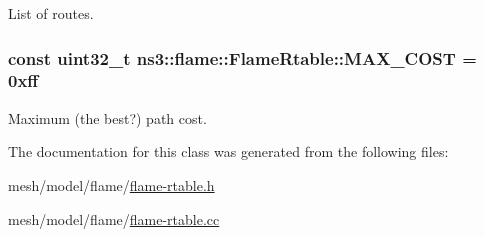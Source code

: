 List of routes. 

\subsubsection[{\texorpdfstring{M\+A\+X\+\_\+\+C\+O\+ST}{MAX_COST}}]{\setlength{\rightskip}{0pt plus 5cm}const uint32\+\_\+t ns3\+::flame\+::\+Flame\+Rtable\+::\+M\+A\+X\+\_\+\+C\+O\+ST = 0xff\hspace{0.3cm}{\ttfamily [static]}}\hypertarget{classns3_1_1flame_1_1FlameRtable_abc65618c03b34257555012ddab0bbf36}{}\label{classns3_1_1flame_1_1FlameRtable_abc65618c03b34257555012ddab0bbf36}


Maximum (the best?) path cost. 



The documentation for this class was generated from the following files\+:\begin{DoxyCompactItemize}
\item 
mesh/model/flame/\hyperlink{flame-rtable_8h}{flame-\/rtable.\+h}\item 
mesh/model/flame/\hyperlink{flame-rtable_8cc}{flame-\/rtable.\+cc}\end{DoxyCompactItemize}
